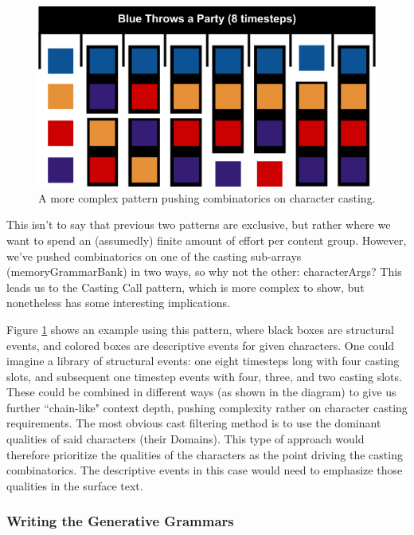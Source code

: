 \begin{figure}
    \centering
    \includegraphics[width=\textwidth]{figures/4-Delve/comb-chain.png}
    \caption{A more complex pattern pushing combinatorics on character casting.}
    \label{fig:comb-chain}
\end{figure}


This isn't to say that previous two patterns are exclusive, but rather where we want to spend an (assumedly) finite amount of effort per content group. However, we've pushed combinatorics on one of the casting sub-arrays (memoryGrammarBank) in two ways, so why not the other: characterArgs? This leads us to the Casting Call pattern, which is more complex to show, but nonetheless has some interesting implications.

Figure \ref{fig:comb-chain} shows an example using this pattern, where black boxes are structural events, and colored boxes are descriptive events for given characters. One could imagine a library of structural events: one eight timesteps long with four casting slots, and subsequent one timestep events with four, three, and two casting slots. These could be combined in different ways (as shown in the diagram) to give us further ``chain-like" context depth, pushing complexity rather on character casting requirements. The most obvious cast filtering method is to use the dominant qualities of said characters (their Domains). This type of approach would therefore prioritize the qualities of the characters as the point driving the casting combinatorics. The descriptive events in this case would need to emphasize those qualities in the surface text.

\subsubsection{Writing the Generative Grammars}\label{subsubsec:delve-writing-the-generative-grammars}

